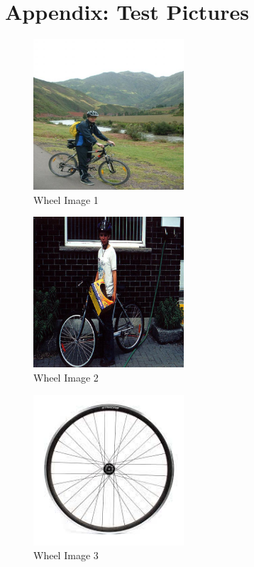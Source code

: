 \clearpage
\section{Appendix: Test Pictures\label{app:test-pictures}}

\begin{figure}[h]
   \centering
   \includegraphics[width=0.5\textwidth]{../test-pictures/wheel/wheel1.jpg}
   \caption{Wheel Image 1}
   \label{fig:wheel1}
\end{figure}


\begin{figure}[h]
   \centering
   \includegraphics[width=0.5\textwidth]{../test-pictures/wheel/wheel2.jpg}
   \caption{Wheel Image 2}
   \label{fig:wheel2}
\end{figure}

\begin{figure}[h]
   \centering
   \includegraphics[width=0.5\textwidth]{../test-pictures/wheel/wheel3.jpg}
   \caption{Wheel Image 3}
   \label{fig:wheel3}
\end{figure}

